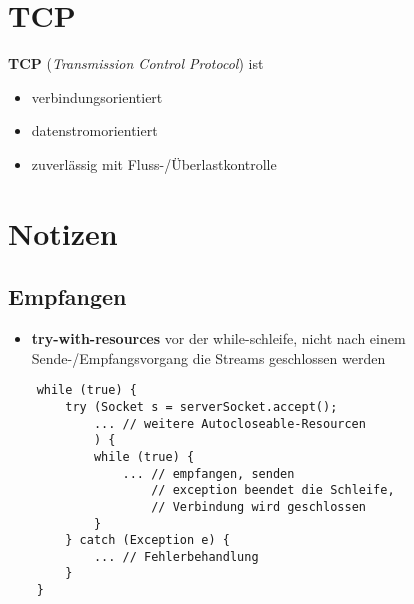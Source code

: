 \section{TCP}

\textbf{TCP} (\textit{Transmission Control Protocol}) ist

\begin{itemize}
    \item verbindungsorientiert
    \item datenstromorientiert
    \item zuverlässig mit Fluss-/Überlastkontrolle
\end{itemize}


\section*{Notizen}

\subsection*{Empfangen}
\begin{itemize}
    \item \textbf{try-with-resources} vor der while-schleife, nicht nach einem Sende-/Empfangsvorgang die Streams geschlossen werden
\end{itemize}


\begin{verbatim}
    while (true) {
        try (Socket s = serverSocket.accept();
            ... // weitere Autocloseable-Resourcen
            ) {
            while (true) {
                ... // empfangen, senden
                    // exception beendet die Schleife,
                    // Verbindung wird geschlossen
            }
        } catch (Exception e) {
            ... // Fehlerbehandlung
        }
    }
\end{verbatim}
